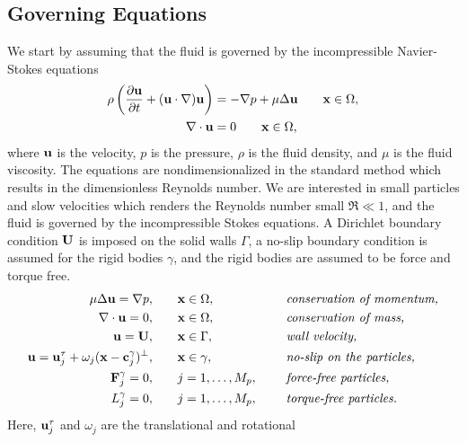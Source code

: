 \documentclass[preprint, 10pt]{elsarticle}
\begin{document}
\subsection{Governing Equations}\label{sec:governing}
We start by assuming that the fluid is governed by the incompressible
Navier-Stokes equations 
\begin{align*}
  \rho\left(\frac{\partial {\mathbf{u}}}{\partial t} + ({\mathbf{u}} \cdot {\nabla}) {\mathbf{u}} \right) &= 
    -{\nabla} p + \mu \Delta {\mathbf{u}} \qquad {\mathbf{x}}\in\Omega,\\
    {\nabla} \cdot {\mathbf{u}} &= 0 \qquad {\mathbf{x}}\in\Omega,
\end{align*}
where ${\mathbf{u}}$ is the velocity, $p$ is the pressure, $\rho$ is the fluid
density, and $\mu$ is the fluid viscosity.  The equations are
nondimensionalized in the standard method which results in the
dimensionless Reynolds number.  We are interested in small particles and
slow velocities which renders the Reynolds number small $\Re \ll 1$, and
the fluid is governed by the incompressible Stokes equations.  A
Dirichlet boundary condition ${\mathbf{U}}$ is imposed on the solid walls
$\Gamma$, a no-slip boundary condition is assumed for the rigid bodies
$\gamma$, and the rigid bodies are assumed to be force and torque free.
\begin{equation}
  \label{eqn:modelEquations}
  \begin{split}
  \mu \Delta {\mathbf{u}} = {\nabla} p, &\hspace{20pt} {\mathbf{x}} \in \Omega, \hspace*{.2in}
    &&\mbox{\em conservation of momentum,}\\
  {\nabla} \cdot {\mathbf{u}} = 0, &\hspace{20pt} {\mathbf{x}} \in \Omega, \hspace*{.2in}
    &&\mbox{\em conservation of mass,} \\
  {\mathbf{u}} = {\mathbf{U}}, &\hspace{20pt} {\mathbf{x}} \in \Gamma, \hspace*{.2in} 
    &&\mbox{\em wall velocity,} \\
  {\mathbf{u}} = {\mathbf{u}}^\tau_j + \omega_j({\mathbf{x}}-{\mathbf{c}}^\gamma_j)^\perp,&\hspace{20pt} 
    {\mathbf{x}} \in \gamma, \hspace*{.2in} &&\mbox{\em no-slip on the particles,} \\
  {\mathbf{F}}_j^\gamma = 0, &\hspace{20pt}j=1,\ldots,M_p, \hspace*{.2in} 
    &&\mbox{\em force-free particles,} \\
  L_j^\gamma = 0, &\hspace{20pt}j=1,\ldots,M_p, \hspace*{.2in} 
    &&\mbox{\em torque-free particles.}
  \end{split}
\end{equation}
Here, ${\mathbf{u}}^\tau_j$ and $\omega_j$ are the translational and rotational
\end{document}
